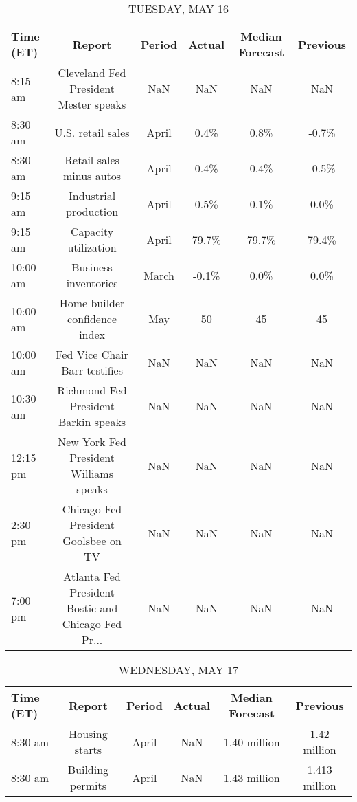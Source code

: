 \documentclass{article}%
\begin{document}
\begin{table}[htbp]%
\caption{TUESDAY, MAY 16}%
\centering%
\begin{adjustbox}{width=1\textwidth}%
\begin{tabular}{lccccc}
\toprule
Time (ET) &                                             Report & Period & Actual & Median Forecast & Previous \\
\midrule
  8:15 am &              Cleveland Fed President Mester speaks &    NaN &    NaN &             NaN &      NaN \\
  8:30 am &                                  U.S. retail sales &  April &   0.4\% &            0.8\% &    -0.7\% \\
  8:30 am &                           Retail sales minus autos &  April &   0.4\% &            0.4\% &    -0.5\% \\
  9:15 am &                              Industrial production &  April &   0.5\% &            0.1\% &     0.0\% \\
  9:15 am &                               Capacity utilization &  April &  79.7\% &           79.7\% &    79.4\% \\
 10:00 am &                               Business inventories &  March &  -0.1\% &            0.0\% &     0.0\% \\
 10:00 am &                      Home builder confidence index &    May &     50 &              45 &       45 \\
 10:00 am &                      Fed Vice Chair Barr testifies &    NaN &    NaN &             NaN &      NaN \\
 10:30 am &               Richmond Fed President Barkin speaks &    NaN &    NaN &             NaN &      NaN \\
 12:15 pm &             New York Fed President Williams speaks &    NaN &    NaN &             NaN &      NaN \\
  2:30 pm &               Chicago Fed President Goolsbee on TV &    NaN &    NaN &             NaN &      NaN \\
  7:00 pm & Atlanta Fed President Bostic and Chicago Fed Pr... &    NaN &    NaN &             NaN &      NaN \\
\bottomrule
\end{tabular}
%
\end{adjustbox}%
\end{table}

%


\begin{table}[htbp]%
\caption{WEDNESDAY, MAY 17}%
\centering%
\begin{adjustbox}{width=1\textwidth}%
\begin{tabular}{lccccc}
\toprule
Time (ET) &           Report & Period & Actual & Median Forecast &      Previous \\
\midrule
  8:30 am &   Housing starts &  April &    NaN &    1.40 million &  1.42 million \\
  8:30 am & Building permits &  April &    NaN &    1.43 million & 1.413 million \\
\bottomrule
\end{tabular}
%
\end{adjustbox}%
\end{table}
\end{document}

